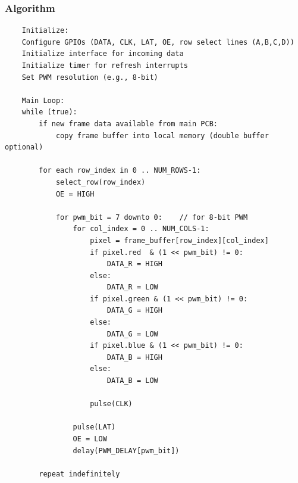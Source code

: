 \subsubsection{Algorithm}

\begin{lstlisting}
    Initialize:
    Configure GPIOs (DATA, CLK, LAT, OE, row select lines (A,B,C,D))
    Initialize interface for incoming data
    Initialize timer for refresh interrupts
    Set PWM resolution (e.g., 8-bit)

    Main Loop:
    while (true):
        if new frame data available from main PCB:
            copy frame buffer into local memory (double buffer optional)
        
        for each row_index in 0 .. NUM_ROWS-1:
            select_row(row_index)        
            OE = HIGH                   
            
            for pwm_bit = 7 downto 0:    // for 8-bit PWM
                for col_index = 0 .. NUM_COLS-1:
                    pixel = frame_buffer[row_index][col_index]
                    if pixel.red  & (1 << pwm_bit) != 0:
                        DATA_R = HIGH
                    else:
                        DATA_R = LOW
                    if pixel.green & (1 << pwm_bit) != 0:
                        DATA_G = HIGH
                    else:
                        DATA_G = LOW
                    if pixel.blue & (1 << pwm_bit) != 0:
                        DATA_B = HIGH
                    else:
                        DATA_B = LOW
                    
                    pulse(CLK)           
                    
                pulse(LAT)                
                OE = LOW                   
                delay(PWM_DELAY[pwm_bit])  
                
        repeat indefinitely
\end{lstlisting}

